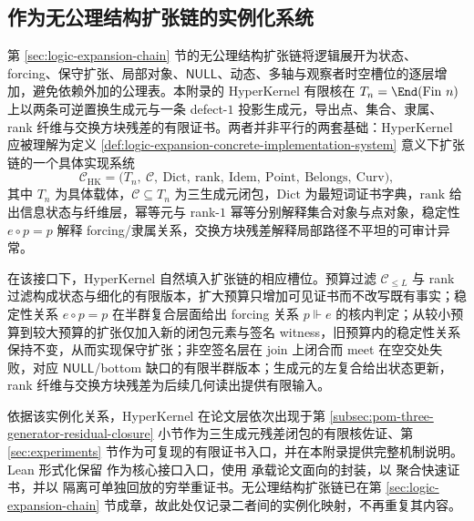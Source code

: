 \subsection{作为无公理结构扩张链的实例化系统}\label{subsec:hyperkernel-two-line-merge-summary}

第 \ref{sec:logic-expansion-chain} 节的无公理结构扩张链将逻辑展开为状态、forcing、保守扩张、局部对象、\(\mathsf{NULL}\)、动态、多轴与观察者时空槽位的逐层增加，避免依赖外加的公理表。本附录的 HyperKernel 有限核在 \(T_n=\End(\mathrm{Fin}\ n)\) 上以两条可逆置换生成元与一条 defect-\(1\) 投影生成元，导出点、集合、隶属、rank 纤维与交换方块残差的有限证书。两者并非平行的两套基础：HyperKernel 应被理解为定义 \ref{def:logic-expansion-concrete-implementation-system} 意义下扩张链的一个具体实现系统
\[
\mathcal C_{\mathrm{HK}}
=
\bigl(
T_n,\ \mathcal C,\ \mathrm{Dict},\ \mathrm{rank},\ \mathrm{Idem},\ \mathrm{Point},\ \mathrm{Belongs},\ \mathrm{Curv}
\bigr),
\]
其中 \(T_n\) 为具体载体，\(\mathcal C\subseteq T_n\) 为三生成元闭包，\(\mathrm{Dict}\) 为最短词证书字典，\(\mathrm{rank}\) 给出信息状态与纤维层，幂等元与 rank-\(1\) 幂等分别解释集合对象与点对象，稳定性 \(e\circ p=p\) 解释 forcing/隶属关系，交换方块残差解释局部路径不平坦的可审计异常。

在该接口下，HyperKernel 自然填入扩张链的相应槽位。预算过滤 \(\mathcal C_{\le L}\) 与 rank 过滤构成状态与细化的有限版本，扩大预算只增加可见证书而不改写既有事实；稳定性关系 \(e\circ p=p\) 在半群复合层面给出 forcing 关系 \(p\Vdash e\) 的核内判定；从较小预算到较大预算的扩张仅加入新的闭包元素与签名 witness，旧预算内的稳定性关系保持不变，从而实现保守扩张；非空签名层在 join 上闭合而 meet 在空交处失败，对应 \(\mathsf{NULL}\)/bottom 缺口的有限半群版本；生成元的左复合给出状态更新，rank 纤维与交换方块残差为后续几何读出提供有限输入。

依据该实例化关系，HyperKernel 在论文层依次出现于第 \ref{subsec:pom-three-generator-residual-closure} 小节作为三生成元残差闭包的有限核佐证、第 \ref{sec:experiments} 节作为可复现的有限证书入口，并在本附录提供完整机制说明。Lean 形式化保留  作为核心接口入口，使用  承载论文面向的封装，以  聚合快速证书，并以  隔离可单独回放的穷举重证书。无公理结构扩张链已在第 \ref{sec:logic-expansion-chain} 节成章，故此处仅记录二者间的实例化映射，不再重复其内容。
